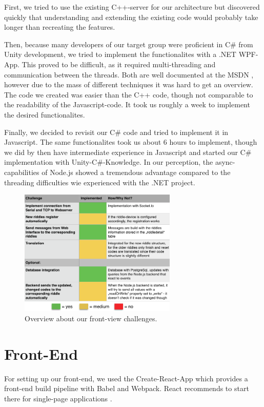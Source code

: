 First, we tried to use the existing C++-server for our architecture but discovered quickly that understanding and extending the existing code would probably take longer than recreating the features.

Then, because many developers of our target group were proficient in C\# from Unity development, we tried to implement the functionalites with a .NET WPF-App.
This proved to be difficult, as it required multi-threading and communication between the threads. Both are well documented at the MSDN \parencite{MSDN}, 
however due to the mass of different techniques it was hard to get an overview. 
The code we created was easier than the C++ code, though not comparable to the readability of the Javascript-code.
It took us roughly a week to implement the desired functionalites. 

Finally, we decided to revisit our C\# code and tried to implement it in Javascript.
The same functionalites took us about 6 hours to implement, though we did by then have intermediate experience in Javascript and started our C\# implementation with Unity-C\#-Knowledge.
In our perception, the async-capabilities of Node.js showed a tremendous advantage compared to the threading difficulties wie experienced with the .NET project.

\begin{figure}[th]
	\centering
	\includegraphics[width=75mm,scale=0.75]{Figures/backendOverview}
	\decoRule
	\caption[FrontViewTable]{Overview about our front-view challenges.}
	\label{fig:FrontViewTable}
\end{figure}

\section{Front-End}
For setting up our front-end, we used the Create-React-App which provides a front-end build pipeline with Babel and Webpack.
React recommends to start there for single-page applications \parencite{createReactApp}. 

